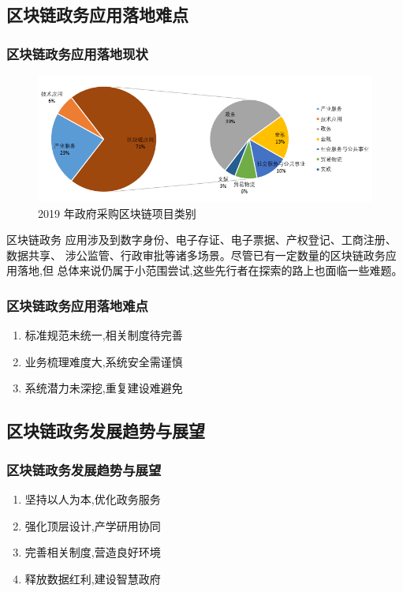 \documentclass[11pt]{beamer}
\begin{document}
\subsection{区块链政务应用落地难点}
\begin{frame}
	\frametitle{区块链政务应用落地现状}
	\begin{figure}
		\centering
		\includegraphics[width=0.9\linewidth]{figures/gov/4}
		\caption{2019 年政府采购区块链项目类别}
		\label{fig:4}
	\end{figure}
{\footnotesize 区块链政务
应用涉及到数字身份、电子存证、电子票据、产权登记、工商注册、数据共享、
涉公监管、行政审批等诸多场景。尽管已有一定数量的区块链政务应用落地,但
总体来说仍属于小范围尝试,这些先行者在探索的路上也面临一些难题。}
\end{frame}

\begin{frame}
	\frametitle{区块链政务应用落地难点}
	\begin{enumerate}
		\item 标准规范未统一,相关制度待完善
		\item 业务梳理难度大,系统安全需谨慎
		\item 系统潜力未深挖,重复建设难避免
	\end{enumerate}
\end{frame}

\subsection{区块链政务发展趋势与展望}
\begin{frame}
	\frametitle{区块链政务发展趋势与展望}
	\begin{enumerate}
		\item 坚持以人为本,优化政务服务
		\item 强化顶层设计,产学研用协同
		\item 完善相关制度,营造良好环境
		\item 释放数据红利,建设智慧政府
	\end{enumerate}
\end{frame}
\end{document}
